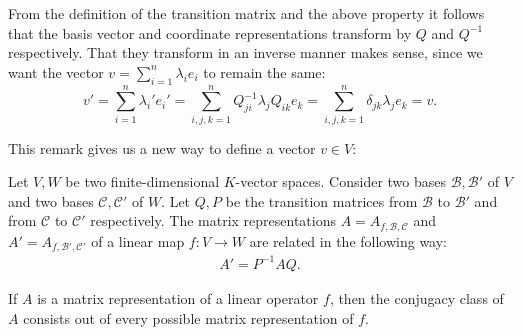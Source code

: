     \begin{remark}
        From the definition of the transition matrix and the above property it follows that the basis vector and coordinate representations transform by $Q$ and $Q^{-1}$ respectively. That they transform in an inverse manner makes sense, since we want the vector $v=\sum_{i=1}^n\lambda_ie_i$ to remain the same: \[v'=\sum_{i=1}^n\lambda_i'e_i'=\sum_{i,j,k=1}^nQ^{-1}_{ji}\lambda_jQ_{ik}e_k = \sum_{i,j,k=1}^n\delta_{jk}\lambda_je_k = v.\]
    \end{remark}
    This remark gives us a new way to define a vector $v\in V$:

    \begin{property}\label{linalgebra:theorem:transition_matrix_representation}
        Let $V,W$ be two finite-dimensional $K$-vector spaces. Consider two bases $\mathcal{B}, \mathcal{B}'$ of $V$ and two bases $\mathcal{C}, \mathcal{C}'$ of $W$. Let $Q, P$ be the transition matrices from $\mathcal{B}$ to $\mathcal{B}'$ and from $\mathcal{C}$ to $\mathcal{C}'$ respectively. The matrix representations $A=A_{f, \mathcal{B}, \mathcal{C}}$ and $A' = A_{f, \mathcal{B}', \mathcal{C}'}$ of a linear map $f:V\rightarrow W$ are related in the following way:
        \begin{gather}
            A' = P^{-1}AQ.
        \end{gather}
    \end{property}

    \begin{remark}
        If $A$ is a matrix representation of a linear operator $f$, then the conjugacy class of $A$ consists out of every possible matrix representation of $f$.
    \end{remark}

